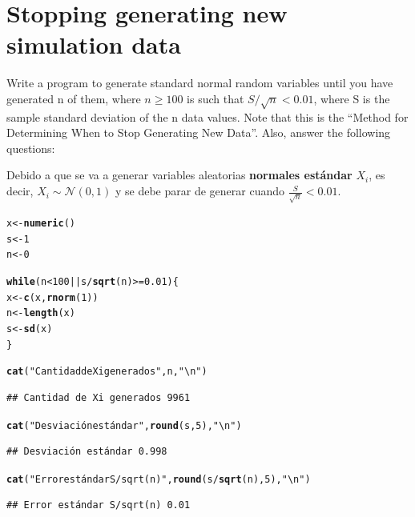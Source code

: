 \documentclass[12pt]{article}\usepackage[]{graphicx}\usepackage[]{xcolor}
\makeatletter
\newcommand{\hlnum}[1]{\textcolor[rgb]{0.686,0.059,0.569}{#1}}%
\newcommand{\hlsng}[1]{\textcolor[rgb]{0.192,0.494,0.8}{#1}}%
\newcommand{\hlopt}[1]{\textcolor[rgb]{0,0,0}{#1}}%
\newcommand{\hldef}[1]{\textcolor[rgb]{0.345,0.345,0.345}{#1}}%
\newcommand{\hlkwa}[1]{\textcolor[rgb]{0.161,0.373,0.58}{\textbf{#1}}}%
\newcommand{\hlkwb}[1]{\textcolor[rgb]{0.69,0.353,0.396}{#1}}%
\newcommand{\hlkwd}[1]{\textcolor[rgb]{0.737,0.353,0.396}{\textbf{#1}}}%
\newenvironment{kframe}{%
 \def\at@end@of@kframe{}%
 \ifinner\ifhmode%
  \def\at@end@of@kframe{\end{minipage}}%
  \begin{minipage}{\columnwidth}%
 \fi\fi%
 \def\FrameCommand##1{\hskip\@totalleftmargin \hskip-\fboxsep
 \colorbox{shadecolor}{##1}\hskip-\fboxsep
     \hskip-\linewidth \hskip-\@totalleftmargin \hskip\columnwidth}%
 \MakeFramed {\advance\hsize-\width
   \@totalleftmargin\z@ \linewidth\hsize
   \@setminipage}}%
 {\par\unskip\endMakeFramed%
 \at@end@of@kframe}
\newenvironment{knitrout}{}{} %
\makeatother
\begin{document}
\section{Stopping generating new simulation data}

Write a program to generate standard normal random variables until you have generated n of them, where $n \geq 100$ is such that $S/\sqrt{n} < 0.01$, where S is the sample standard deviation of the n data values. Note that this is the ``Method for Determining When to Stop Generating New Data''. Also, answer the following questions:



Debido a que se va a generar variables aleatorias \textbf{normales estándar} $X_{i}$, es decir, $X_{i} \sim \mathcal{N}(0, 1)$ y se debe parar de generar cuando $\frac{S}{\sqrt{n}} < 0.01$.

\begin{knitrout}
\color{fgcolor}\begin{kframe}
\begin{alltt}
\hldef{x} \hlkwb{<-} \hlkwd{numeric}\hldef{()}
\hldef{s} \hlkwb{<-} \hlnum{1}
\hldef{n} \hlkwb{<-} \hlnum{0}

\hlkwa{while}\hldef{(n} \hlopt{<} \hlnum{100} \hlopt{||} \hldef{s} \hlopt{/} \hlkwd{sqrt}\hldef{(n)} \hlopt{>=} \hlnum{0.01}\hldef{) \{}
  \hldef{x} \hlkwb{<-} \hlkwd{c}\hldef{(x,} \hlkwd{rnorm}\hldef{(}\hlnum{1}\hldef{))}
  \hldef{n} \hlkwb{<-} \hlkwd{length}\hldef{(x)}
  \hldef{s} \hlkwb{<-} \hlkwd{sd}\hldef{(x)}
\hldef{\}}

\hlkwd{cat}\hldef{(}\hlsng{"Cantidad de Xi generados"}\hldef{, n,} \hlsng{"\textbackslash{}n"}\hldef{)}
\end{alltt}
\begin{verbatim}
## Cantidad de Xi generados 9961
\end{verbatim}
\begin{alltt}
\hlkwd{cat}\hldef{(}\hlsng{"Desviación estándar"}\hldef{,} \hlkwd{round}\hldef{(s,} \hlnum{5}\hldef{),} \hlsng{"\textbackslash{}n"}\hldef{)}
\end{alltt}
\begin{verbatim}
## Desviación estándar 0.998
\end{verbatim}
\begin{alltt}
\hlkwd{cat}\hldef{(}\hlsng{"Error estándar S/sqrt(n)"}\hldef{,} \hlkwd{round}\hldef{(s}\hlopt{/}\hlkwd{sqrt}\hldef{(n),} \hlnum{5}\hldef{),} \hlsng{"\textbackslash{}n"}\hldef{)}
\end{alltt}
\begin{verbatim}
## Error estándar S/sqrt(n) 0.01
\end{verbatim}
\end{kframe}
\end{knitrout}
\end{document}
